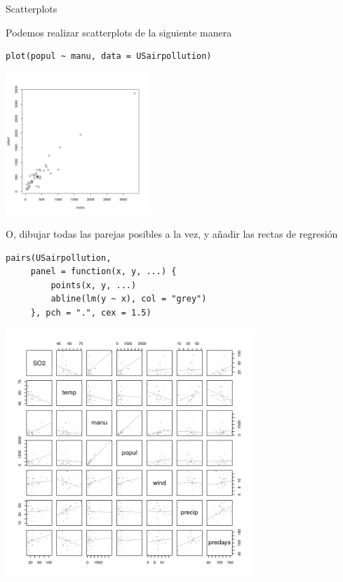 \documentclass[xcolor=table]{beamer}
\begin{document}
\begin{frame}[fragile]{Scatterplots}

Podemos realizar scatterplots de la siguiente manera



\begin{lstlisting}
plot(popul ~ manu, data = USairpollution)
\end{lstlisting}
\centering
\includegraphics[width=0.4\textwidth]{scatter.png}



\end{frame}
\begin{frame}[fragile]
O, dibujar todas las parejas posibles a la vez, y añadir las rectas de regresión

\begin{lstlisting}
pairs(USairpollution,
     panel = function(x, y, ...) {
         points(x, y, ...)
         abline(lm(y ~ x), col = "grey")
     }, pch = ".", cex = 1.5)
\end{lstlisting}
\end{frame}
\begin{frame}
\centering
\includegraphics[width=0.7\textwidth]{reg.png}
\end{frame}
\end{document}
